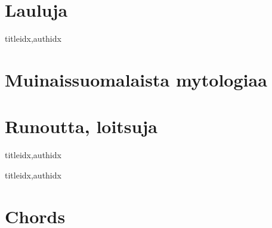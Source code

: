 \documentclass[twoside,10pt,finnish]{book}
\renewcommand{\lyricfont}{\sffamily\Large} %
\begin{document}
  \clearpage\scleardpage
    \section{Lauluja}
      \begin{songs}{titleidx,authidx}
        \setcounter{songnum}{700}
        
      \end{songs}

    \clearpage\scleardpage
    \section{Muinaissuomalaista mytologiaa}
      
    \clearpage\scleardpage
    \section{Runoutta, loitsuja}
      \begin{songs}{titleidx,authidx}
        \setcounter{songnum}{800}
        \chordsoff %
        \renewcommand{\lyricfont}{\sffamily\small} %
        
        \renewcommand{\lyricfont}{\sffamily\Large} %
        \chordson
      \end{songs}

  \clearpage\scleardpage
    \begin{songs}{titleidx,authidx}
      \setcounter{songnum}{900}
      
    \end{songs}      

  \clearpage\scleardpage
    \section{Chords}
      
  
  \clearpage
\end{document}
